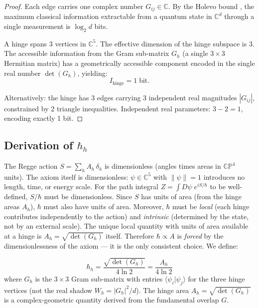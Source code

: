 \documentclass[12pt]{article}
\theoremstyle{remark}
\theoremstyle{definition}
\newcommand{\CC}{\mathbb{C}}
\begin{document}
\begin{proof}
Each edge carries one complex number $G_{ij} \in \CC$. By the Holevo bound \cite{Holevo}, the maximum classical information extractable from a quantum state in $\CC^d$ through a single measurement is $\log_2 d$ bits.

A hinge spans 3 vertices in $\CC^5$. The effective dimension of the hinge subspace is 3. The accessible information from the Gram sub-matrix $G_h$ (a single $3\times 3$ Hermitian matrix) has a geometrically accessible component encoded in the single real number $\det(G_h)$, yielding:
\begin{equation}
I_\text{hinge} = 1\;\text{bit}.
\end{equation}

Alternatively: the hinge has 3 edges carrying 3 independent real magnitudes $|G_{ij}|$, constrained by 2 triangle inequalities. Independent real parameters: $3 - 2 = 1$, encoding exactly 1 bit.
\end{proof}

\subsection{Derivation of $\hbar_h$}

The Regge action $S = \sum_h A_h\,\delta_h$ is dimensionless (angles times areas in $\mathbb{CP}^4$ units). The axiom itself is dimensionless: $\psi \in \CC^5$ with $\|\psi\| = 1$ introduces no length, time, or energy scale. For the path integral $Z = \int D\psi\; e^{iS/\hbar}$ to be well-defined, $S/\hbar$ must be dimensionless. Since $S$ has units of area (from the hinge areas $A_h$), $\hbar$ must also have units of area. Moreover, $\hbar$ must be \emph{local} (each hinge contributes independently to the action) and \emph{intrinsic} (determined by the state, not by an external scale). The unique local quantity with units of area available at a hinge is $A_h = \sqrt{\det(G_h)}$ itself. Therefore $\hbar \propto A$ is \emph{forced} by the dimensionlessness of the axiom --- it is the only consistent choice. We define:

\begin{equation}
\boxed{\hbar_h = \frac{\sqrt{\det(G_h)}}{4\ln 2} = \frac{A_h}{4\ln 2}}
\label{eq:hbar}
\end{equation}
where $G_h$ is the $3 \times 3$ Gram sub-matrix with entries $\langle\psi_i|\psi_j\rangle$ for the three hinge vertices (not the real shadow $W_h = |G_h|^2/d$). The hinge area $A_h = \sqrt{\det(G_h)}$ is a complex-geometric quantity derived from the fundamental overlap $G$.
\end{document}
